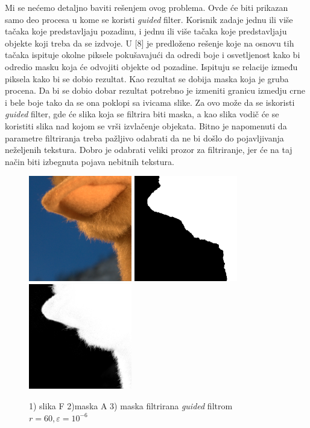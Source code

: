 \documentclass[a4paper,12pt,titlepage]{article}
\begin{document}
Mi se nećemo detaljno baviti rešenjem ovog problema. Ovde će biti prikazan samo deo procesa u kome se koristi \emph{guided} filter. Korisnik zadaje jednu ili više tačaka koje predstavljaju pozadinu, i jednu ili više tačaka koje predstavljaju objekte koji treba da se izdvoje. U [8] je predloženo rešenje koje na osnovu tih tačaka ispituje okolne piksele pokušavajući da odredi boje i osvetljenost kako bi odredio masku koja će odvojiti objekte od pozadine. Ispituju se relacije između piksela kako bi se dobio rezultat. Kao rezultat se dobija maska koja je gruba procena. Da bi se dobio dobar rezultat potrebno je izmeniti granicu izmedju crne i bele boje tako da se ona poklopi sa ivicama slike. Za ovo može da se iskoristi \emph{guided} filter, gde će slika koja se filtrira biti maska, a kao slika vodič će se koristiti slika nad kojom se vrši izvlačenje objekata. Bitno je napomenuti da parametre filtriranja treba pažljivo odabrati da ne bi došlo do pojavljivanja neželjenih tekstura. Dobro je odabrati veliki prozor za filtriranje, jer će na taj način biti izbegnuta pojava nebitnih tekstura.

\begin{figure}[ht!]
\centering
\includegraphics[width=45mm]{img/toy.png}
\includegraphics[width=45mm]{img/toyMask.png}
\includegraphics[width=45mm]{img/toyMaskGF.png}
\caption{1) slika F 2)maska A 3) maska filtrirana \emph{guided} filtrom $r = 60, \varepsilon = 10^{-6}$}
\label{overflow}
\end{figure}    
\end{document}
